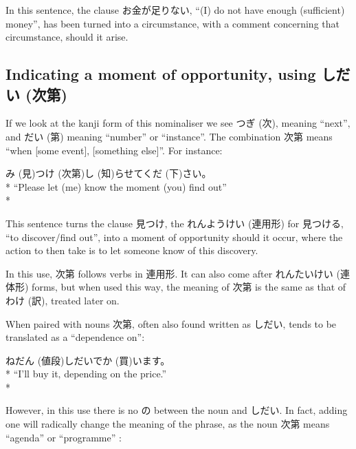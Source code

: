 \documentclass[11pt, b5paper, twoside, openright, onecolumn]{book}
\makeatletter
\newcommand*{\rubystack}[2]{{\relscale{0.5}%
  \begin{tabular}[b]{@{}c@{}}%
    {#1}\\%
   {\textscale{2}{#2}}%
  \end{tabular}}%
}
\DeclareRobustCommand*{\ruby}[2]{%
  \mbox{%
    \setlength{\parskip}{0ex}%
    \BeginAccSupp{method=pdfstringdef,ActualText={#1}}%
      \rubystack{\phantom{#2}}{#1}%
      \llap{%
        \rubystack{#2}{\phantom{#1}}%
      }%
    \EndAccSupp{}%
  }%
}
\renewcommand*{\ruby}[2]{#2 (#1)}%
\newenvironment{exampleblock}{
\setlength{\parindent}{0.6in}
\begin{minipage}[t]{\dimexpr\textwidth-\parindent}}
{\end{minipage}}
\makeatother
\begin{document}
In this sentence‚ the clause お金が足りない‚ “(I) do not have enough (sufficient) money”‚ has been turned into a circumstance‚ with a comment concerning that circumstance‚ should it arise.

\subsection{Indicating a moment of opportunity‚ using \ruby{次第}{しだい}}

If we look at the kanji form of this nominaliser we see \ruby{次}{つぎ}‚ meaning “next”‚ and \ruby{第}{だい} meaning “number” or “instance”. The combination 次第 means “when [some event]‚ [something else]”. For instance:

\vspace{0.4cm}
\begin{exampleblock}
\ruby{見}{み}つけ\ruby{次第}{}\ruby{知}{し}らせて\ruby{下}{くだ}さい。 \\* 
“Please let (me) know the moment (you) find out” \\* 
\end{exampleblock}
\vspace{0.2cm}

This sentence turns the clause 見つけ‚ the \ruby{連用形}{れんようけい} for 見つける‚ “to discover/\linebreak[0]find out”‚ into a moment of opportunity should it occur‚ where the action to then take is to let someone know of this discovery.

In this use‚ 次第 follows verbs in 連用形. It can also come after \ruby{連体形}{れんたいけい} forms‚ but when used this way‚ the meaning of 次第 is the same as that of わけ (訳)‚ treated later on.

When paired with nouns 次第‚ often also found written as しだい‚ tends to be translated as a “dependence on”:

\vspace{0.4cm}
\begin{exampleblock}
\ruby{値段}{ねだん}しだいで\ruby{買}{か}います。 \\* 
“I’ll buy it‚ depending on the price.” \\* 
\end{exampleblock}
\vspace{0.2cm}

However‚ in this use there is no の between the noun and しだい. In fact‚ adding one will radically change the meaning of the phrase‚ as the noun 次第 means “agenda” or “programme” :
\end{document}
